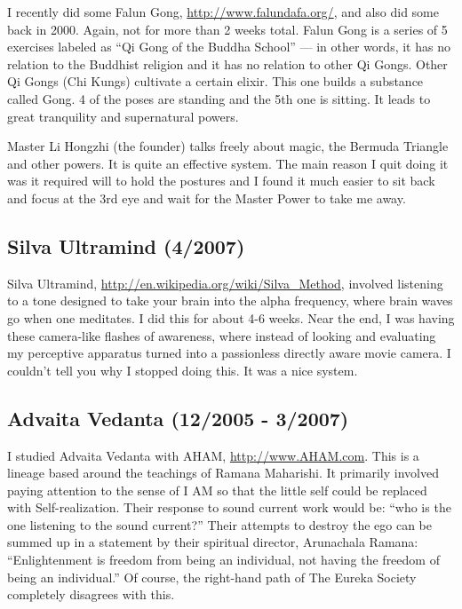 \documentclass[12pt]{article}%
\begin{document}
I recently did some Falun Gong, \url{http://www.falundafa.org/}, and also did some back in 2000. Again, not for more than 2 weeks total. Falun Gong is a series of 5 exercises labeled as ``Qi Gong of the Buddha School'' --- in other words, it has no relation to the Buddhist religion and it has no relation to other Qi Gongs. Other Qi Gongs (Chi Kungs) cultivate a certain elixir. This one builds a substance called Gong. 4 of the poses are standing and the 5th one is sitting. It leads to great tranquility and supernatural powers.

Master Li Hongzhi (the founder) talks freely about magic, the Bermuda Triangle and other powers. It is quite an effective system. The main reason I quit doing it was it required will to hold the postures and I found it much easier to sit back and focus at the 3rd eye and wait for the Master Power to take me away.

\subsection{Silva Ultramind (4/2007) }

Silva Ultramind, \url{http://en.wikipedia.org/wiki/Silva_Method}, involved listening to a tone designed to take your brain into the alpha frequency, where brain waves go when one meditates. I did this for about 4-6 weeks. Near the end, I was having these camera-like flashes of awareness, where instead of looking and evaluating my perceptive apparatus turned into a passionless directly aware movie camera. I couldn't tell you why I stopped doing this. It was a nice system.

\subsection{Advaita Vedanta (12/2005 - 3/2007)}

I studied Advaita Vedanta with AHAM, \url{http://www.AHAM.com}. This is a lineage based around the teachings of Ramana Maharishi. It primarily involved paying attention to the sense of I AM so that the little self could be replaced with Self-realization. Their response to sound current work would be: ``who is the one listening to the sound current?'' Their attempts to destroy the ego can be summed up in a statement by their spiritual director, Arunachala Ramana: ``Enlightenment is freedom from being an individual, not having the freedom of being an individual.'' Of course, the right-hand path of The Eureka Society completely disagrees with this.
\end{document}
